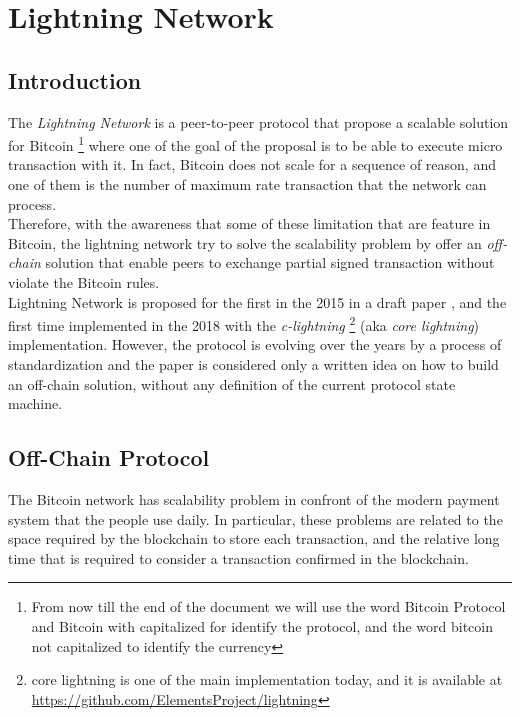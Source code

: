 \setcounter{page}{1}
\chapter{Lightning Network}

\newcommand{\noteOnBitcoinNaming}[0]{
    \footnote{
        From now till the end of the document we will use the word Bitcoin Protocol and
        Bitcoin with capitalized for identify the protocol, and the word bitcoin not capitalized to identify the currency
    }
}

\newcommand{\noteOnCLNImpl}[0]{
    \footnote{
    core lightning is one of the main implementation today, and it is available at
    \href{https://github.com/ElementsProject/lightning}{https://github.com/ElementsProject/lightning}
    }
}



\section{Introduction}

The \emph{Lightning Network} is a peer-to-peer protocol that propose a scalable solution for Bitcoin\noteOnBitcoinNaming where one
of the goal of the proposal is to be able to execute micro transaction with it.
In fact, Bitcoin does not scale for a sequence of reason, and one of them is the number of
maximum rate transaction that the network can process.\\
Therefore, with the awareness that some of these limitation that are feature in Bitcoin, the lightning network try to solve
the scalability problem by offer an \emph{off-chain} solution that enable peers to exchange partial
signed transaction without violate the Bitcoin rules.\\
Lightning Network is proposed for the first in the 2015 in a draft paper \cite{lightning-network-paper},
and the first time implemented in the 2018 with the \emph{c-lightning}\noteOnCLNImpl (aka \emph{core lightning}) implementation.
However, the protocol is evolving over the years by a process of standardization\cite{lightning-bolts} and the paper is considered
only a written idea on how to build an off-chain solution, without any definition of the current protocol state machine.

\section{Off-Chain Protocol}

The Bitcoin network has scalability problem in confront of the modern payment system that the people use daily.
In particular, these problems are related to the space required by the blockchain to store each transaction,
and the relative long time that is required to consider a transaction confirmed in the blockchain.

